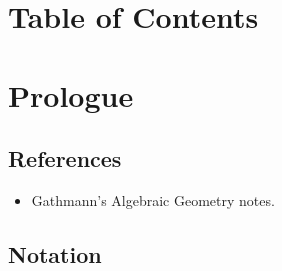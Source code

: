 \newpage

\section*{Table of Contents}
\tableofcontents
\newpage

\hypertarget{prologue}{%
\section*{Prologue}\label{prologue}}

\hypertarget{references}{%
\subsection{References}\label{references}}

\begin{itemize}
\tightlist
\item
  Gathmann's Algebraic Geometry notes\autocite{AndreasGathmann515}.
\end{itemize}

\hypertarget{notation}{%
\subsection{Notation}\label{notation}}

